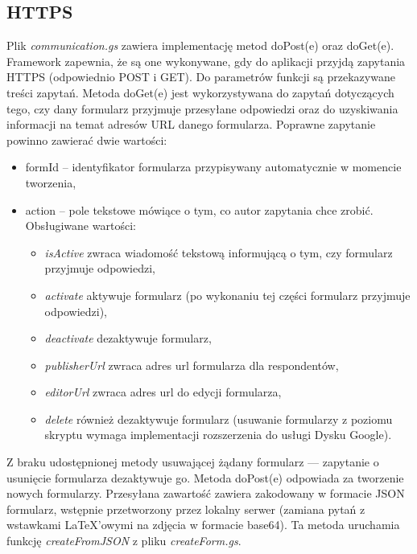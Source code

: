 \subsection{HTTPS}
Plik \textit{communication.gs} zawiera implementację metod doPost(e) oraz doGet(e). Framework zapewnia, że są one wykonywane, gdy do aplikacji przyjdą zapytania HTTPS (odpowiednio POST i GET). Do parametrów funkcji są przekazywane treści zapytań.
\ind Metoda doGet(e) jest wykorzystywana do zapytań dotyczących tego, czy dany formularz przyjmuje przesyłane odpowiedzi oraz do uzyskiwania informacji na temat adresów URL danego formularza.  Poprawne zapytanie powinno zawierać dwie wartości:
\begin{itemize}
\item formId -- identyfikator formularza przypisywany automatycznie w momencie tworzenia,
\item action -- pole tekstowe mówiące o tym, co autor zapytania chce zrobić. Obsługiwane wartości:
\begin{itemize}
\item \textit{isActive} zwraca wiadomość tekstową informującą o tym, czy formularz przyjmuje odpowiedzi,
\item \textit{activate} aktywuje formularz (po wykonaniu tej części formularz przyjmuje odpowiedzi),
\item \textit{deactivate} dezaktywuje formularz,
\item \textit{publisherUrl} zwraca adres url formularza dla respondentów,
\item \textit{editorUrl} zwraca adres url do edycji formularza,
\item \textit{delete} również dezaktywuje formularz (usuwanie formularzy z poziomu skryptu wymaga implementacji rozszerzenia do usługi Dysku Google).
\end{itemize}
\end{itemize}
Z braku udostępnionej metody usuwającej żądany formularz --- zapytanie o usunięcie formularza dezaktywuje go. 
\ind Metoda doPost(e) odpowiada  za tworzenie nowych formularzy. Przesyłana zawartość zawiera zakodowany w formacie JSON formularz, wstępnie przetworzony przez lokalny serwer (zamiana pytań z wstawkami \LaTeX{}'owymi na zdjęcia w formacie base64). Ta metoda uruchamia funkcję \textit{createFromJSON} z pliku \textit{createForm.gs}.
